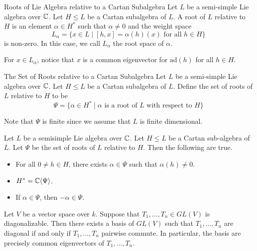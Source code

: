 \documentclass[a4paper]{article}
\begin{document}
\begin{defn}{Roots of Lie Algebra relative to a Cartan Subalgebra}{} Let $L$ be a semi-simple Lie algebra over $\mathbb{C}$. Let $H\leq L$ be a Cartan subalgebra of $L$. A root of $L$ relative to $H$ is an element $\alpha\in H^\ast$ such that $\alpha\neq 0$ and the weight space $$L_\alpha=\{x\in L\;|\;[h,x]=\alpha(h)(x)\text{ for all }h\in H\}$$ is non-zero. In this case, we call $L_\alpha$ the root space of $\alpha$. 
\end{defn}

For $x\in L_\alpha$, notice that $x$ is a common eigenvector for $\text{ad}(h)$ for all $h\in H$. 

\begin{defn}{The Set of Roots relative to a Cartan Subalgebra}{} Let $L$ be a semi-simple Lie algebra over $\mathbb{C}$. Let $H\leq L$ be a Cartan subalgebra of $L$. Define the set of roots of $L$ relative to $H$ to be $$\Psi=\{\alpha\in H^\ast\;|\;\alpha\text{ is a root of }L\text{ with respect to }H\}$$
\end{defn}

Note that $\Psi$ is finite since we assume that $L$ is finite dimensional. 

\begin{lmm}{}{} Let $L$ be a semisimple Lie algebra over $\mathbb{C}$. Let $H\leq L$ be a Cartan sub-algebra of $L$. Let $\Psi$ be the set of roots of $L$ relative to $H$. Then the following are true. 
\begin{itemize}
\item For all $0\neq h\in H$, there exists $\alpha\in\Psi$ such that $\alpha(h)\neq 0$. 
\item $H^\ast=\mathbb{C}\langle\Psi\rangle$. 
\item If $\alpha\in\Psi$, then $-\alpha\in\Psi$. 
\end{itemize}
\end{lmm}

\begin{lmm}{}{} Let $V$ be a vector space over $k$. Suppose that $T_1,\dots,T_n\in GL(V)$ is diagonalizable. Then there exists a basis of $GL(V)$ such that $T_1,\dots,T_n$ are diagonal if and only if $T_1,\dots,T_n$ pairwise commute. In particular, the basis are precisely common eigenvectors of $T_1,\dots,T_n$. 
\end{lmm}
\end{document}
